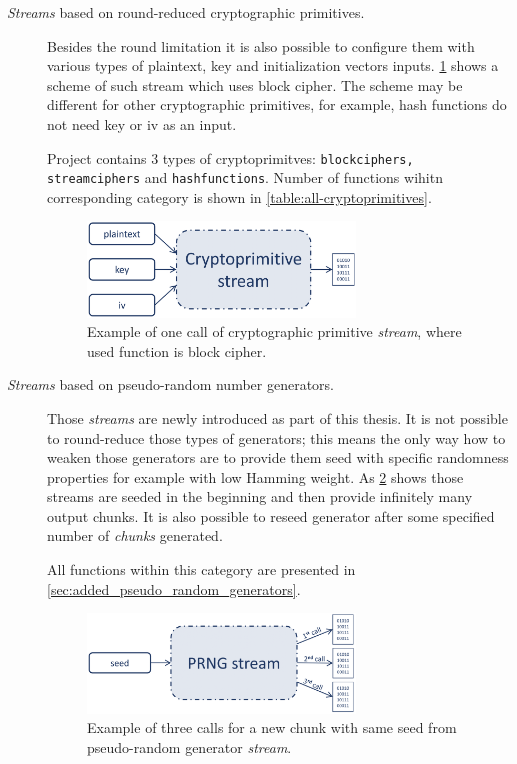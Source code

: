 \documentclass[
    digital,    %
    oneside,    %
    color,
    11pt,
    nocover,
    notable,
    nolof,
    nolot,
    final
]{fithesis3}
\renewcommand\_{\textunderscore\allowbreak}
\begin{document}
\begin{description}
	\item[\textit{Streams} based on round-reduced cryptographic primitives.] Besides the round limitation it is also possible to configure them with various types of plaintext, key and initialization vectors inputs. \cref{fig:crypto-stream} shows a scheme of such stream which uses block cipher. The scheme may be different for other cryptographic primitives, for example, hash functions do not need key or iv as an input.
	
	Project contains 3 types of cryptoprimitves: \texttt{block\_ciphers, stream\_ciphers} and \texttt{hash\_functions}. Number of functions wihitn corresponding category is shown in \cref{table:all-cryptoprimitives}.
	
	\begin{figure}[h]
		\centering
		\includegraphics[width=0.7\textwidth]{./images/pictures/cryptoprimitive-stream.png}
		\caption{Example of one call of cryptographic primitive \textit{stream}, where used function is block cipher.}
		\label{fig:crypto-stream}
	\end{figure}
	
	\item[\textit{Streams} based on pseudo-random number generators.] Those \textit{streams} are newly introduced as part of this thesis. It is not possible to round-reduce those types of generators; this means the only way how to weaken those generators are to provide them seed with specific randomness properties for example with low Hamming weight. As \cref{fig:prng-streams} shows those streams are seeded in the beginning and then provide infinitely many output chunks. It is also possible to reseed generator after some specified number of \textit{chunks} generated. 
	
	All functions within this category are presented in \cref{sec:added_pseudo_random_generators}.
	
	\begin{figure}[h]
		\centering
		\includegraphics[width=0.7\textwidth]{./images/pictures/prng-stream.png}
		\caption{Example of three calls for a new chunk with same seed from pseudo-random generator \textit{stream}.}
		\label{fig:prng-streams}
	\end{figure}
	
\end{description}
\end{document}
